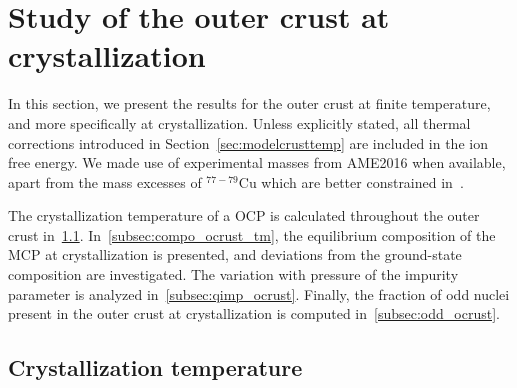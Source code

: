 \section{Study of the outer crust at crystallization}\label{sec:ocrust_tm}

In this section, we present the results for the outer crust at finite
temperature, and more specifically at crystallization.
Unless explicitly stated, all thermal corrections introduced in
Section~\ref{sec:modelcrusttemp} are included in the ion free energy.
We made use of experimental masses from AME2016 \cite{Huang2017} when 
available, apart from the mass excesses of $^{77-79}$Cu which are better 
constrained in~\cite{Welker2017}.

The crystallization temperature of a OCP is calculated throughout the outer
crust in~\ref{subsec:tm_ocrust}. In~\ref{subsec:compo_ocrust_tm}, the
equilibrium composition of the MCP at crystallization is presented, and 
deviations from the ground-state composition are investigated. The variation 
with pressure of the impurity parameter is analyzed 
in~\ref{subsec:qimp_ocrust}. Finally, the fraction of odd nuclei present in the 
outer crust at crystallization is computed in~\ref{subsec:odd_ocrust}.

\subsection{Crystallization temperature}\label{subsec:tm_ocrust}

